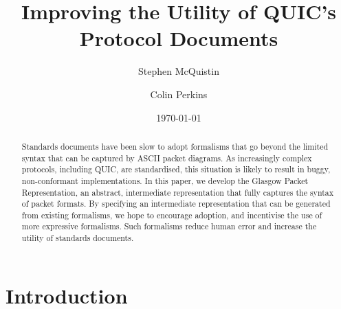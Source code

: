 \documentclass[10pt,sigconf]{acmart}
\begin{document}
\title{Improving the Utility of QUIC's Protocol Documents}

\author{Stephen McQuistin}

\author{Colin Perkins}

\date{\today}

\begin{abstract}


Standards documents have been slow to adopt formalisms that go beyond the limited syntax
that can be captured by ASCII packet diagrams. As increasingly complex protocols,
including QUIC, are standardised, this situation is likely to result in buggy,
non-conformant implementations. In this paper, we develop the Glasgow Packet
Representation, an abstract, intermediate representation that fully captures the syntax of
packet formats. By specifying an intermediate representation that can be generated from
existing formalisms, we hope to encourage adoption, and incentivise the use of more
expressive formalisms. Such formalisms reduce human error and increase the utility of standards documents.

\end{abstract}

\maketitle

\section{Introduction}

%
\end{document}
